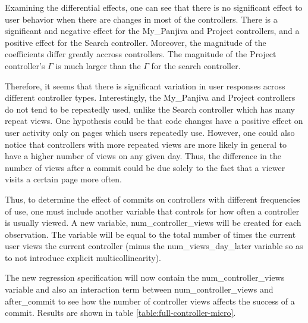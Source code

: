 \documentclass[10pt]{article}
\begin{document}
Examining the differential effects, one can see that there is no significant effect to user behavior when there are changes in most of the controllers. There is a significant and negative effect for the My\_Panjiva and Project controllers, and a positive effect for the Search controller. Moreover, the magnitude of the coefficients differ greatly accross controllers. The magnitude of the Project controller's $\Gamma$ is much larger than the $\Gamma$ for the search controller. 

Therefore, it seems that there is significant variation in user responses across different controller types. Interestingly, the My\_Panjiva and Project controllers do not tend to be repeatedly used, unlike the Search controller which has many repeat views. One hypothesis could be that code changes have a positive effect on user activity only on pages which users repeatedly use. However, one could also notice that controllers with more repeated views are more likely in general to have a higher number of views on any given day. Thus, the difference in the number of views after a commit could be due solely to the fact that a viewer visits a certain page more often.

Thus, to determine the effect of commits on controllers with different frequencies of use, one must include another variable that controls for how often a controller is usually viewed. A new variable, num\_controller\_views will be created for each observation. The variable will be equal to the total number of times the current user views the current controller (minus the num\_views\_day\_later variable so as to not introduce explicit multicollinearity). 

The new regression specification will now contain the num\_controller\_views variable and also an interaction term between num\_controller\_views and after\_commit to see how the number of controller views affects the success of a commit. Results are shown in table \ref{table:full-controller-micro}.
\end{document}
